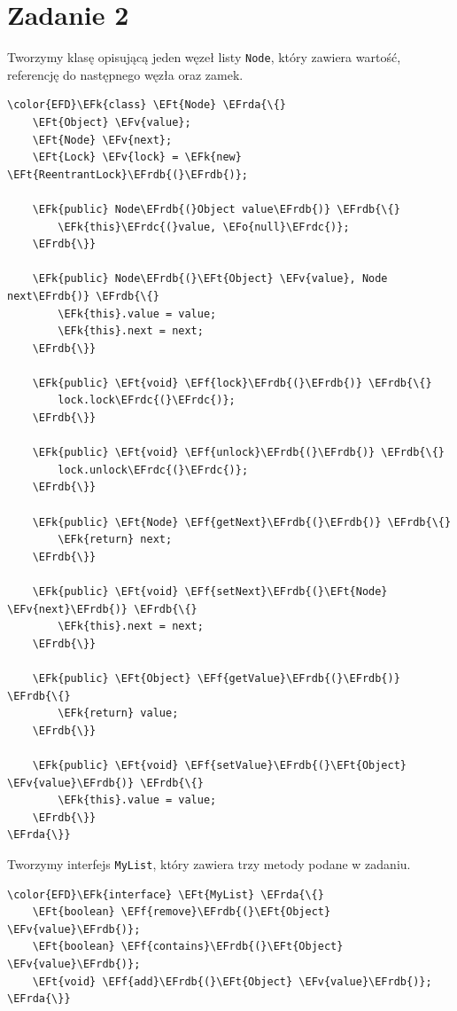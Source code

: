\documentclass[11pt]{article}
\newcommand{\EFk}[1]{\textcolor{EFk}{#1}} %
\newcommand{\EFf}[1]{\textcolor{EFf}{#1}} %
\newcommand{\EFv}[1]{\textcolor{EFv}{#1}} %
\newcommand{\EFt}[1]{\textcolor{EFt}{#1}} %
\newcommand{\EFo}[1]{\textcolor{EFo}{#1}} %
\newcommand{\EFrda}[1]{#1} %
\newcommand{\EFrdb}[1]{\textcolor{EFrdb}{#1}} %
\newcommand{\EFrdc}[1]{\textcolor{EFrdc}{#1}} %
\begin{document}
\newpage
\section*{Zadanie 2}
\label{sec:org5b4f820}
Tworzymy klasę opisującą jeden węzeł listy \texttt{Node}, który zawiera wartość, referencję do następnego węzła oraz zamek.

\begin{Code}
\begin{Verbatim}
\color{EFD}\EFk{class} \EFt{Node} \EFrda{\{}
    \EFt{Object} \EFv{value};
    \EFt{Node} \EFv{next};
    \EFt{Lock} \EFv{lock} = \EFk{new} \EFt{ReentrantLock}\EFrdb{(}\EFrdb{)};

    \EFk{public} Node\EFrdb{(}Object value\EFrdb{)} \EFrdb{\{}
        \EFk{this}\EFrdc{(}value, \EFo{null}\EFrdc{)};
    \EFrdb{\}}

    \EFk{public} Node\EFrdb{(}\EFt{Object} \EFv{value}, Node next\EFrdb{)} \EFrdb{\{}
        \EFk{this}.value = value;
        \EFk{this}.next = next;
    \EFrdb{\}}

    \EFk{public} \EFt{void} \EFf{lock}\EFrdb{(}\EFrdb{)} \EFrdb{\{}
        lock.lock\EFrdc{(}\EFrdc{)};
    \EFrdb{\}}

    \EFk{public} \EFt{void} \EFf{unlock}\EFrdb{(}\EFrdb{)} \EFrdb{\{}
        lock.unlock\EFrdc{(}\EFrdc{)};
    \EFrdb{\}}

    \EFk{public} \EFt{Node} \EFf{getNext}\EFrdb{(}\EFrdb{)} \EFrdb{\{}
        \EFk{return} next;
    \EFrdb{\}}

    \EFk{public} \EFt{void} \EFf{setNext}\EFrdb{(}\EFt{Node} \EFv{next}\EFrdb{)} \EFrdb{\{}
        \EFk{this}.next = next;
    \EFrdb{\}}

    \EFk{public} \EFt{Object} \EFf{getValue}\EFrdb{(}\EFrdb{)} \EFrdb{\{}
        \EFk{return} value;
    \EFrdb{\}}

    \EFk{public} \EFt{void} \EFf{setValue}\EFrdb{(}\EFt{Object} \EFv{value}\EFrdb{)} \EFrdb{\{}
        \EFk{this}.value = value;
    \EFrdb{\}}
\EFrda{\}}
\end{Verbatim}
\end{Code}

Tworzymy interfejs \texttt{MyList}, który zawiera trzy metody podane w zadaniu.
\begin{Code}
\begin{Verbatim}
\color{EFD}\EFk{interface} \EFt{MyList} \EFrda{\{}
    \EFt{boolean} \EFf{remove}\EFrdb{(}\EFt{Object} \EFv{value}\EFrdb{)};
    \EFt{boolean} \EFf{contains}\EFrdb{(}\EFt{Object} \EFv{value}\EFrdb{)};
    \EFt{void} \EFf{add}\EFrdb{(}\EFt{Object} \EFv{value}\EFrdb{)};
\EFrda{\}}
\end{Verbatim}
\end{Code}
\end{document}

